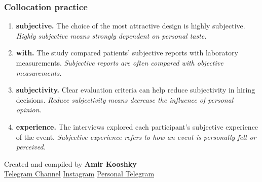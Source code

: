 \documentclass[11pt]{article}
\begin{document}
\subsubsection{Collocation practice}
\begin{enumerate}
  \item \textbf{subjective.} The choice of the most attractive design is highly subjective. \emph{Highly subjective means strongly dependent on personal taste.}
  \item \textbf{with.} The study compared patients' subjective reports with laboratory measurements. \emph{Subjective reports are often compared with objective measurements.}
  \item \textbf{subjectivity.} Clear evaluation criteria can help reduce subjectivity in hiring decisions. \emph{Reduce subjectivity means decrease the influence of personal opinion.}
  \item \textbf{experience.} The interviews explored each participant's subjective experience of the event. \emph{Subjective experience refers to how an event is personally felt or perceived.}
\end{enumerate}

\vfill
\begin{center}
\small\color{Muted} Created and compiled by \textbf{Amir Kooshky}\\
\href{https://t.me/KooshkyTOEFL}{Telegram Channel}\quad\textbullet\quad
\href{https://www.instagram.com/kooshkytoefl}{Instagram}\quad\textbullet\quad
\href{https://t.me/KooshkyTOEFL\_pv}{Personal Telegram}
\end{center}
\end{document}
